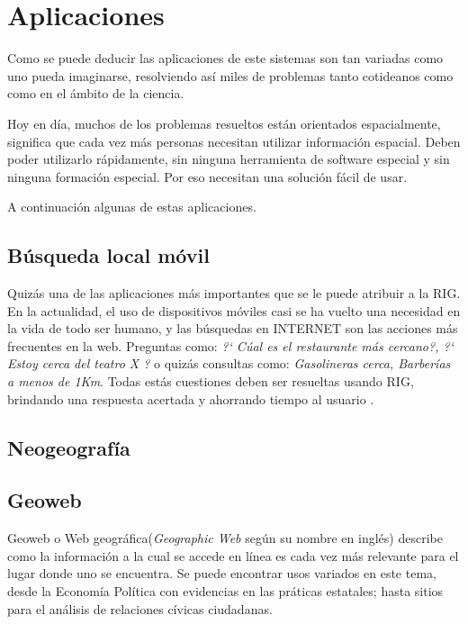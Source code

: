 \section{Aplicaciones}\label{sec:appl}

\newpage

Como se puede deducir las aplicaciones de este sistemas son tan variadas como
uno pueda imaginarse, resolviendo así miles de problemas tanto cotideanos como
como en el ámbito de la ciencia.

Hoy en día, muchos de los problemas resueltos están orientados espacialmente,
significa que cada vez más personas necesitan utilizar información espacial.
Deben poder utilizarlo rápidamente, sin ninguna herramienta de software
especial y sin ninguna formación especial. Por eso necesitan una solución
fácil de usar.

A continuación algunas de estas aplicaciones.

\subsection{Búsqueda local móvil}\label{sec:mobile}

Quizás una de las aplicaciones más importantes que se le puede atribuir a la
RIG. En la actualidad, el uso de dispositivos móviles casi se ha vuelto una
necesidad en la vida de todo ser humano, y las búsquedas en INTERNET son las
acciones más frecuentes en la web. Preguntas como: \emph{?` Cúal es el
restaurante más cercano?, ?` Estoy cerca del teatro X ?} o quizás consultas
como: \emph{Gasolineras cerca, Barberías a menos de 1Km}. Todas estás
cuestiones deben ser resueltas usando RIG, brindando una respuesta acertada y
ahorrando tiempo al usuario \cite{teevan2011, lymberopoulos2011}. 

\subsection{Neogeografía}\label{sec:neogeo}

\subsection{Geoweb}\label{sec:geoweb}

Geoweb o Web geográfica(\emph{Geographic Web} según su nombre en inglés)
describe como la información a la cual se accede en línea es cada vez más
relevante para el lugar donde uno se encuentra. Se puede encontrar usos
variados en este tema, desde la Economía Política con evidencias en las
práticas estatales\cite{leszczynski2012}; hasta sitios para el análisis
de relaciones cívicas ciudadanas\cite{johnson2015}.

